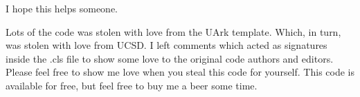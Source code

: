 I hope this helps someone.  

Lots of the code was stolen with love from the UArk template.  Which, in turn, was stolen with love from UCSD.  I left comments which acted as signatures inside the .cls file to show some love to the original code authors and editors.  Please feel free to show me love when you steal this code for yourself.  This code is available for free, but feel free to buy me a beer some time.